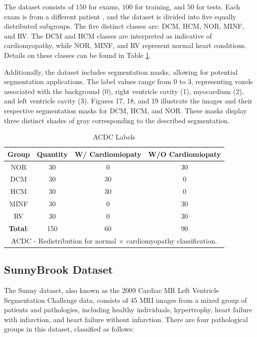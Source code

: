 \documentclass[journal,twoside,web]{ieeecolor}
\begin{document}
The dataset consists of $150$ for exams, $100$ for training, and $50$ for tests. Each exam is from a different patient , and the dataset is divided into five equally distributed subgroups. The five distinct classes are: \gls{DCM}, \gls{HCM}, \gls{NOR}, \gls{MINF}, and \gls{RV}. The \gls{DCM} and \gls{HCM} classes are interpreted as indicative of cardiomyopathy, while \gls{NOR}, \gls{MINF}, and \gls{RV} represent normal heart conditions. Details on these classes can be found in Table \ref{table01}.  

Additionally, the dataset includes segmentation masks, allowing for potential segmentation applications. The label values range from 0 to 3, representing voxels associated with the background (0), right ventricle cavity (1), myocardium (2), and left ventricle cavity (3). Figures 17, 18, and 19 illustrate the images and their respective segmentation masks for \gls{DCM}, \gls{HCM}, and NOR. These masks display three distinct shades of gray corresponding to the described segmentation.


\begin{table}[h]
\centering
\caption{ACDC Labels}
\label{table01}
\setlength{\tabcolsep}{4pt}
\begin{tabular}{|c|c|c|c|}
    \hline 
          \textbf{Group} & \textbf{Quantity} & \textbf{W/ Cardiomiopaty} & \textbf{W/O Cardiomiopaty}  \\ 
    \hline 
        NOR & 30 & 0 & 30 \\ 
        DCM & 30 & 30 & 0\\ 
        HCM & 30 & 30 & 0\\ 
        MINF & 30 & 0 & 30 \\ 
        RV & 30 & 0 & 30 \\
    \hline 
        \textbf{Total}: & 150  & 60 & 90\\ 
    \hline 
    \multicolumn{4}{p{230pt}}{ACDC - Redistribution for normal $\times$ cardiomyopathy classification. } \\
\end{tabular} 
\end{table}


\subsection{SunnyBrook Dataset}
The Sunny dataset, also known as the 2009 Cardiac MR Left Ventricle Segmentation Challenge data, consists of 45 MRI images from a mixed group of patients and pathologies, including healthy individuals, hypertrophy, heart failure with infarction, and heart failure without infarction. There are four pathological groups in this dataset, classified as follows:  
\end{document}
